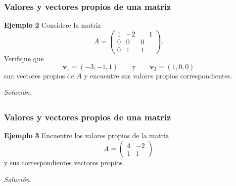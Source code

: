 \begin{frame}\frametitle{Valores y vectores propios de una matriz}


\begin{ej}{\textbf{Ejemplo 2}}
	Considere la matriz
	\[
	A =
	\left(
	\begin{array}{rrr}
	1 & -2 & \phantom{-}1 \\[1mm]
	0 &  0 & 0 \\[1mm]
	0 &  1 & 1
	\end{array}
	\right).
	\]	
	Verifique que
	\[
		\mathbf{v}_1=(-3,-1,1) \qquad \text{y} \qquad \mathbf{v}_2=(1,0,0)
	\]
	son vectores propios de $A$ y encuentre sus valores propios correspondientes.
\end{ej}
\textit{Solución.}

\end{frame}


\subsection{}

\begin{frame}\frametitle{Valores y vectores propios de una matriz}


\begin{ej}{\textbf{Ejemplo 3}}
	Encuentre los valores propios de la matriz
	\[
	A =
	\left(
	\begin{array}{rr}
	4 & -2 \\[1mm]
	1 &  1
	\end{array}
	\right)
	\]	
	y sus correspondientes vectores propios.
\end{ej}
\textit{Solución.}

\end{frame}

